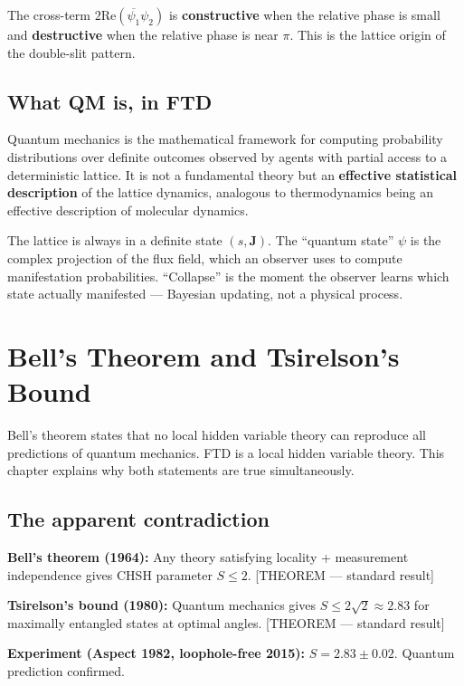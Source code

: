 \documentclass[
  11pt,
  letterpaper,
  twoside,
  openany]{book}
\makeatletter
\let\orig@section\section
\renewcommand{\section}{\needspace{8\baselineskip}\orig@section}
\makeatother
\begin{document}
The cross-term \(2\text{Re}(\overline{\psi_1}\psi_2)\) is
\textbf{constructive} when the relative phase is small and
\textbf{destructive} when the relative phase is near \(\pi\). This is
the lattice origin of the double-slit pattern.

\section{What QM is, in FTD}\label{what-qm-is-in-ftd}

Quantum mechanics is the mathematical framework for computing
probability distributions over definite outcomes observed by agents with
partial access to a deterministic lattice. It is not a fundamental
theory but an \textbf{effective statistical description} of the lattice
dynamics, analogous to thermodynamics being an effective description of
molecular dynamics.

The lattice is always in a definite state \((s, \mathbf{J})\). The
``quantum state'' \(\psi\) is the complex projection of the flux field,
which an observer uses to compute manifestation probabilities.
``Collapse'' is the moment the observer learns which state actually
manifested --- Bayesian updating, not a physical process.

\chapter{Bell's Theorem and Tsirelson's Bound}\label{sec-bell}

Bell's theorem states that no local hidden variable theory can reproduce
all predictions of quantum mechanics. FTD is a local hidden variable
theory. This chapter explains why both statements are true
simultaneously.

\section{The apparent contradiction}\label{the-apparent-contradiction}

\textbf{Bell's theorem (1964):} Any theory satisfying locality +
measurement independence gives CHSH parameter \(S \leq 2\). {[}THEOREM
--- standard result{]}

\textbf{Tsirelson's bound (1980):} Quantum mechanics gives
\(S \leq 2\sqrt{2} \approx 2.83\) for maximally entangled states at
optimal angles. {[}THEOREM --- standard result{]}

\textbf{Experiment (Aspect 1982, loophole-free 2015):}
\(S = 2.83 \pm 0.02\). Quantum prediction confirmed.
\end{document}
